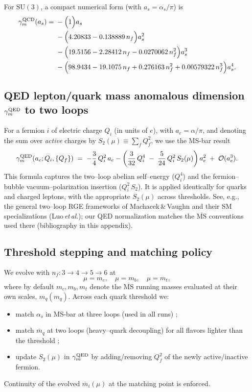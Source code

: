 \documentclass[aps,prd,onecolumn,amsmath,amssymb,superscriptaddress,nofootinbib,showpacs,showkeys]{revtex4-2}
\begin{document}
For $\mathrm{SU}(3)$, a compact numerical form (with $a_s=\alpha_s/\pi$) is
\[
\begin{aligned}
\gamma_m^{\rm QCD}(a_s)=\;&
-\Big(1\Big)a_s\\
& -\Big(4.20833 - 0.138889\,n_f\Big)a_s^2\\
& -\Big(19.5156 - 2.28412\,n_f - 0.0270062\,n_f^2\Big)a_s^3\\
& -\Big(98.9434 - 19.1075\,n_f + 0.276163\,n_f^2 + 0.00579322\,n_f^3\Big)a_s^4.
\end{aligned}
\]

\subsection{ QED lepton/quark mass anomalous dimension \texorpdfstring{$\gamma_m^{\rm QED}$}{gamma\_m(QED)} to two loops}
For a fermion $i$ of electric charge $Q_i$ (in units of $e$), with $a_e=\alpha/\pi$, and denoting the sum over \emph{active} charges by $\displaystyle S_2(\mu)\equiv\sum_f Q_f^2$, we use the MS-bar result
\[
\gamma_m^{\rm QED}(a_e;Q_i,\{Q_f\}) \;=\;
-\frac{3}{4}\,Q_i^2\,a_e
-\left(\frac{3}{32}\,Q_i^4 \;-\; \frac{5}{24}\,Q_i^2\,S_2(\mu)\right)a_e^2
\;+\; \mathcal{O}(a_e^3).
\]
This formula captures the two–loop abelian self–energy ($Q_i^4$) and the fermion–bubble vacuum–polarization insertion ($Q_i^2\,S_2$). It is applied identically for quarks and charged leptons, with the appropriate $S_2(\mu)$ across thresholds. See, e.g., the general two–loop RGE frameworks of Machacek\,\&\,Vaughn and their SM specializations (Luo\,\emph{et\,al.}); our QED normalization matches the $\overline{\mathrm{MS}}$ conventions used there (bibliography in this appendix).

\subsection{ Threshold stepping and matching policy}
We evolve with $n_f:3\to4\to5\to6$ at
\[
\mu=m_c,\quad \mu=m_b,\quad \mu=m_t,
\]
where by default $m_c,m_b,m_t$ denote the $\overline{\mathrm{MS}}$ running masses evaluated at their own scales, $m_q(m_q)$. Across each quark threshold we:
\begin{itemize}
\item match $\alpha_s$ in MS-bar at three loops (used in all runs) \cite{CKS1998,RunDec3};
\item match $\overline{m}_q$ at two loops (heavy–quark decoupling) for all flavors lighter than the threshold \cite{CKS1998};
\item update $S_2(\mu)$ in $\gamma_m^{\rm QED}$ by adding/removing $Q_f^2$ of the newly active/inactive fermion.
\end{itemize}
Continuity of the evolved $\overline{m}_i(\mu)$ at the matching point is enforced.
\end{document}
